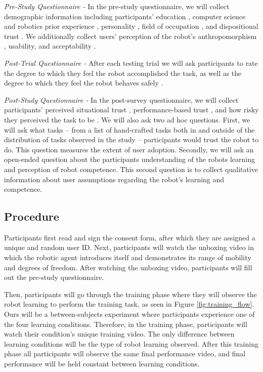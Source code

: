 \documentclass[letterpaper]{article} %
\begin{document}
\textit{Pre-Study Questionnaire -} In the pre-study questionnaire, we will collect demographic information including participants' education \cite{raub_correlates_nodate}, computer science and robotics prior experience \cite{raub_correlates_nodate}, personality \cite{donnellan_mini-ipip_2006}, field of occupation \cite{noauthor_college_nodate}, and dispositional trust \cite{merritt_i_2013}. We additionally collect users' perception of the robot's anthropomorphism \cite{bartneck_measurement_2009}, usability, and acceptability \cite{belanche_integrating_2012}.

\textit{Post-Trial Questionnaire -}
After each testing trial we will ask participants to rate the degree to which they feel the robot accomplished the task, as well as the degree to which they feel the robot behaves safely \cite{bartneck_measurement_2009}.

\textit{Post-Study Questionnaire -}
In the post-survey questionnaire, we will collect participants' perceived situational trust \cite{jian_foundations_2000}, performance-based trust \cite{malle_multidimensional_2021}, and how risky they perceived the task to be \cite{fischhoff_how_1978}. We will also ask two ad hoc questions. First, we will ask what tasks -- from a list of hand-crafted tasks both in and outside of the distribution of tasks observed in the study -- participants would trust the robot to do. This question measures the extent of user adoption. Secondly, we will ask an open-ended question about the participants understanding of the robots learning and perception of robot competence. This second question is to collect qualitative information about user assumptions regarding the robot's learning and competence.

\subsection{Procedure}
\label{sec:procedure}
Participants first read and sign the consent form, after which they are assigned a unique and random user ID. Next, participants will watch the unboxing video in which the robotic agent introduces itself and demonstrates its range of mobility and degrees of freedom. After watching the unboxing video, participants will fill out the pre-study questionnaire. 

Then, participants will go through the training phase where they will observe the robot learning to perform the training task, as seen in Figure \ref{fig:training_flow}. Ours will be a between-subjects experiment where participants experience one of the four learning conditions. Therefore, in the training phase, participants will watch their condition's unique training video. The only difference between learning conditions will be the type of robot learning observed. After this training phase all participants will observe the same final performance video, and final performance will be held constant between learning conditions. 
\end{document}
